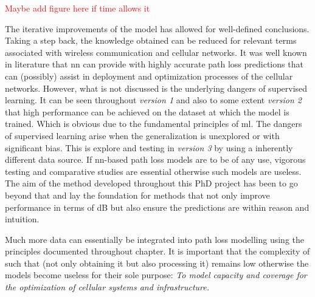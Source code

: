 \textcolor{red}{Maybe add figure here if time allows it}


The iterative improvements of the model has allowed for well-defined conclusions. Taking a step back, the knowledge obtained can be reduced for relevant terms associated with wireless communication and cellular networks. It was well known in literature that \gls{nn} can provide with highly accurate path loss predictions that can (possibly) assist in deployment and optimization processes of the cellular networks. However, what is not discussed is the underlying dangers of supervised learning. It can be seen throughout \emph{version 1} and also to some extent \emph{version 2} that high performance can be achieved on the dataset at which the model is trained. Which is obvious due to the fundamental principles of \gls{ml}. The dangers of supervised learning arise when the generalization is unexplored or with significant bias. This is explore and testing in \emph{version 3} by using a inherently different data source. If \gls{nn}-based path loss models are to be of any use, vigorous testing and comparative studies are essential otherwise such models are useless. The aim of the method developed throughout this PhD project has been to go beyond that and lay the foundation for methods that not only improve performance in terms of dB but also ensure the predictions are within reason and intuition. 

Much more data can essentially be integrated into path loss modelling using the principles documented throughout chapter. It is important that the complexity of such that (not only obtaining it but also processing it) remains low otherwise the models become useless for their sole purpose: \emph{To model capacity and coverage for the optimization of cellular systems and infrastructure.}